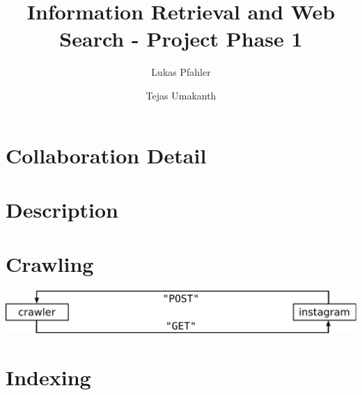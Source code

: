 \documentclass[11pt]{article}
\title{Information Retrieval and Web Search - Project Phase 1}
\author{Lukas Pfahler \and Tejas Umakanth}
\begin{document}
\maketitle
\section{Collaboration Detail}
\section{Description}
\section{Crawling}
	\includegraphics[width=\textwidth,keepaspectratio]{crawler.pdf}
\section{Indexing}
\end{document}
